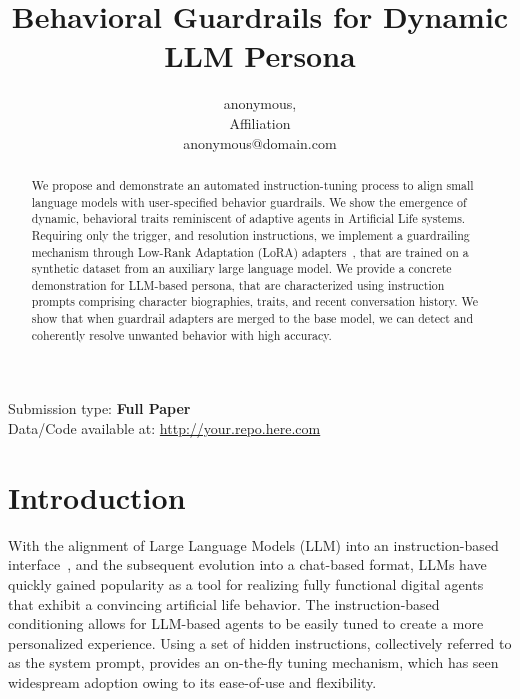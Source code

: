 \documentclass[letterpaper]{article}
\title{Behavioral Guardrails for Dynamic LLM Persona}
\author{
    anonymous, 
    \mbox{}\\
    Affiliation \\ 
    anonymous@domain.com
} %
\begin{document}
\maketitle

\begin{abstract}
    We propose and demonstrate an automated instruction-tuning process to align small language models with user-specified behavior guardrails. We show the emergence of dynamic, behavioral traits reminiscent of adaptive agents in Artificial Life systems.
Requiring only the trigger, and resolution instructions, we implement a guardrailing mechanism through Low-Rank Adaptation (LoRA) adapters~\cite{hu2021lora}, that are trained on a synthetic dataset from an auxiliary large language model. 
We provide a concrete demonstration for LLM-based persona, that are characterized using instruction prompts comprising character biographies, traits, and recent conversation history. We show that when guardrail adapters are merged to the base model, we can detect and coherently resolve unwanted behavior with high accuracy. 
\end{abstract}


Submission type: \textbf{Full Paper}\\

Data/Code available at: \url{http://your.repo.here.com}

\section{Introduction}
With the alignment of Large Language Models (LLM) into an instruction-based interface~\cite{ouyang2022training}, and the subsequent evolution into a chat-based format, LLMs have quickly gained popularity as a tool for realizing fully functional digital agents that exhibit a convincing artificial life behavior.
The instruction-based conditioning allows for LLM-based agents to be easily tuned to create a more personalized experience. Using a set of hidden instructions, collectively referred to as the system prompt, provides an on-the-fly tuning mechanism, which has seen widespream adoption owing to its ease-of-use and flexibility.
\end{document}
